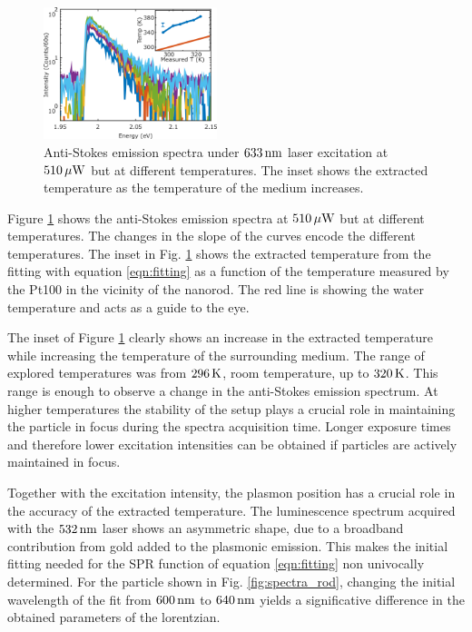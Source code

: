 \begin{figure}[htp] \centering
\includegraphics[width=0.45\textwidth]{Chapters/04_Anti-Stokes/Figures/04_Extracted_Temp/04_extracted_temp.png}
\caption{Anti-Stokes emission spectra under $633\,\textrm{nm}$ laser excitation at
$510\,\mu\textrm{W}$ but at different temperatures. The inset shows the extracted
temperature as the temperature of the medium increases.}
	\label{fig:AS-temps-rods}
\end{figure}

Figure \ref{fig:AS-temps-rods} shows the anti-Stokes emission spectra at
$510\,\mu\textrm{W}$ but at different temperatures. The changes in the slope of the curves
encode the different temperatures. The inset in Fig. \ref{fig:AS-temps-rods}
shows the extracted temperature from the fitting with equation \ref{eqn:fitting}
as a function of the temperature measured by the Pt100 in the vicinity of the
nanorod. The red line is showing the water temperature and acts as a guide to
the eye.

The inset of Figure \ref{fig:AS-temps-rods} clearly shows an increase in the
extracted temperature while increasing the temperature of the surrounding
medium. The range of explored temperatures was from $296\,\textrm{K}$, room temperature,
up to $320\,\textrm{K}$. This range is enough to observe a change in the anti-Stokes
emission spectrum. At higher temperatures the stability of the setup
plays a crucial role in maintaining the particle in focus during the spectra
acquisition time. Longer exposure times and therefore lower excitation
intensities can be obtained if particles are actively maintained in focus.

Together with the excitation intensity, the plasmon position has a crucial role
in the accuracy of the extracted temperature. The luminescence spectrum acquired
with the $532\,\textrm{nm}$ laser shows an asymmetric shape, due to a broadband
contribution from gold added to the plasmonic emission. This makes the initial
fitting needed for the SPR function of equation \ref{eqn:fitting} non univocally
determined. For the particle shown in Fig. \ref{fig:spectra_rod}, changing the
initial wavelength of the fit from $600\,\textrm{nm}$ to $640\,\textrm{nm}$ yields a significative
difference in the obtained parameters of the lorentzian.

